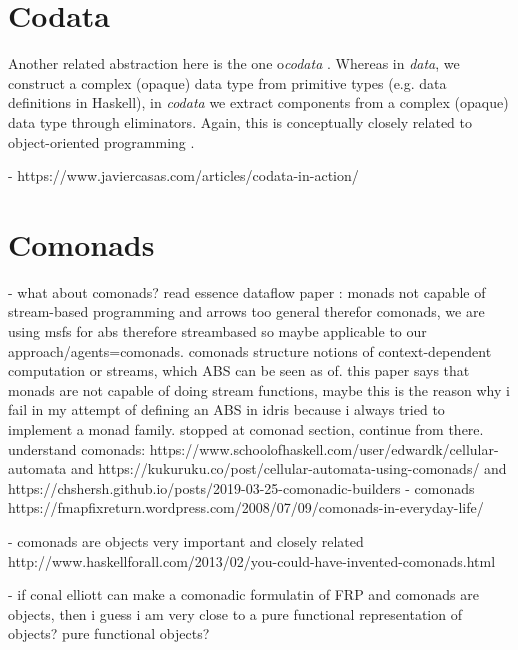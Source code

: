 
\section{Codata}
Another related abstraction here is the one o\textit{codata} \cite{downen_codata_2019}. Whereas in \textit{data}, we construct a complex (opaque) data type from primitive types (e.g. data definitions in Haskell), in \textit{codata} we extract components from a complex (opaque) data type through eliminators. Again, this is conceptually closely related to object-oriented programming \cite{downen_codata_2019}.

- https://www.javiercasas.com/articles/codata-in-action/

\section{Comonads}

- what about comonads? read essence dataflow paper \cite{uustalu_essence_2006}: monads not capable of stream-based programming and arrows too general therefor comonads, we are using msfs for abs therefore streambased so maybe applicable to our approach/agents=comonads. comonads structure notions of context-dependent computation or streams, which ABS can be seen as of. this paper says that monads are not capable of doing stream functions, maybe this is the reason why i fail in my attempt of defining an ABS in idris because i always tried to implement a monad family. stopped at comonad section, continue from there. understand comonads: https://www.schoolofhaskell.com/user/edwardk/cellular-automata and https://kukuruku.co/post/cellular-automata-using-comonads/ and https://chshersh.github.io/posts/2019-03-25-comonadic-builders
- comonads https://fmapfixreturn.wordpress.com/2008/07/09/comonads-in-everyday-life/

- comonads are objects very important and closely related http://www.haskellforall.com/2013/02/you-could-have-invented-comonads.html

- if conal elliott can make a comonadic formulatin of FRP and comonads are objects, then i guess i am very close to a pure functional representation of objects? pure functional objects?

